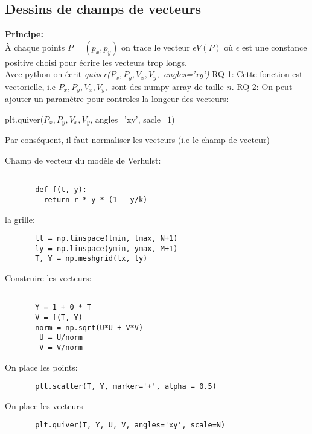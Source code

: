 \subsection{Dessins de champs de vecteurs}
\textbf{\large Principe:}\\
À chaque points $P = (p_x, p_y)$ on trace le vecteur  $\epsilon V(P)$ où  $\epsilon$ est une constance positive choisi pour écrire les vecteurs trop longs.\\
Avec python on écrit \textit{quiver($P_x, P_y, V_x, V_y,$ angles='xy')}
RQ 1: Cette fonction est vectorielle, i.e $P_x, P_y, V_x, V_y,$ sont des numpy array de taille  $n$.
RQ 2: On peut ajouter un paramètre pour controles la longeur des vecteurs:
 \begin{center}
   plt.quiver($P_x, P_y, V_x, V_y$, angles='xy', sacle=$1$) 
\end{center}
Par conséquent, il faut normaliser les vecteurs (i.e le champ de vecteur)
\begin{eg}
   Champ de vecteur du modèle de Verhulst:
   \begin{lstlisting}
       
       def f(t, y):
         return r * y * (1 - y/k)
     \end{lstlisting}
    la grille:

   \begin{lstlisting}
       lt = np.linspace(tmin, tmax, N+1)
       ly = np.linspace(ymin, ymax, M+1)
       T, Y = np.meshgrid(lx, ly)
   \end{lstlisting}
    Construire les vecteurs:

    \begin{lstlisting}
        
       Y = 1 + 0 * T
       V = f(T, Y)
       norm = np.sqrt(U*U + V*V)
        U = U/norm
        V = V/norm
    \end{lstlisting}
    On place les points:
    \begin{lstlisting}
       plt.scatter(T, Y, marker='+', alpha = 0.5)
\end{lstlisting}
    On place les vecteurs
    \begin{lstlisting}
       plt.quiver(T, Y, U, V, angles='xy', scale=N)
\end{lstlisting}
\end{eg}
